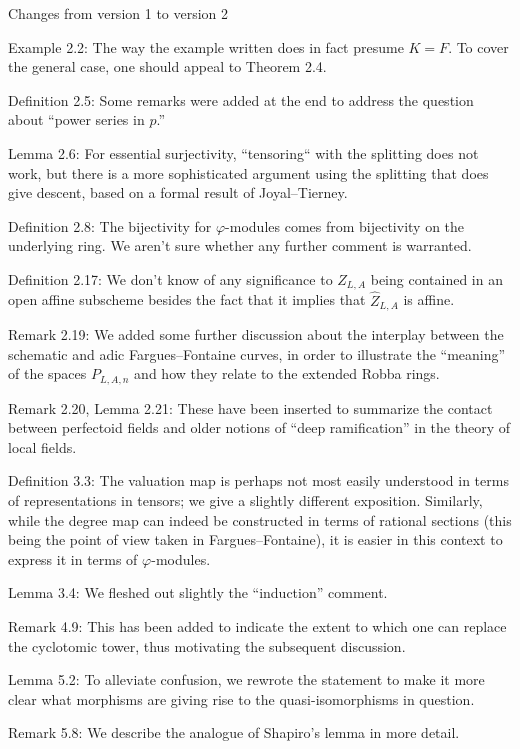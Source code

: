 \documentclass[12pt]{amsart}
\begin{document}
\begin{center}
Changes from version 1 to version 2
\end{center}

Example 2.2: The way the example written does in fact presume $K = F$. To cover the general case, one should appeal to Theorem 2.4.

Definition 2.5: Some remarks were added at the end to address the question about ``power series in $p$.''

Lemma 2.6: For essential surjectivity, ``tensoring`` with the splitting does not work, but there is a more sophisticated argument using the splitting that does give descent, based on a formal result of Joyal--Tierney.

Definition 2.8: The bijectivity for $\varphi$-modules comes from bijectivity on the underlying ring. We aren't sure whether any further comment is warranted.

Definition 2.17: We don't know of any significance to $Z_{L,A}$ being contained in an open affine subscheme besides the fact that it implies that $\widehat{Z}_{L,A}$ is affine.

Remark 2.19: We added some further discussion about the interplay between the schematic and adic Fargues--Fontaine curves, in order to illustrate the ``meaning'' of the spaces $P_{L,A,n}$ and how they relate to the extended Robba rings.

Remark 2.20, Lemma 2.21: These have been inserted to summarize the contact between perfectoid fields and older notions of ``deep ramification'' in the theory of local fields.

Definition 3.3: The valuation map is perhaps not most easily understood in terms of representations in tensors; we give a slightly different exposition. Similarly, while the degree map can indeed be constructed in terms of rational sections (this being the point of view taken in Fargues--Fontaine), it is easier in this context to express it in terms of $\varphi$-modules.

Lemma 3.4: We fleshed out slightly the ``induction'' comment.

Remark 4.9: This has been added to indicate the extent to which one can replace the cyclotomic tower, thus motivating the subsequent discussion.

Lemma 5.2: To alleviate confusion, we rewrote the statement to make it more clear what morphisms are giving rise to the quasi-isomorphisms in question.

Remark 5.8: We describe the analogue of Shapiro's lemma in more detail.
\end{document}
